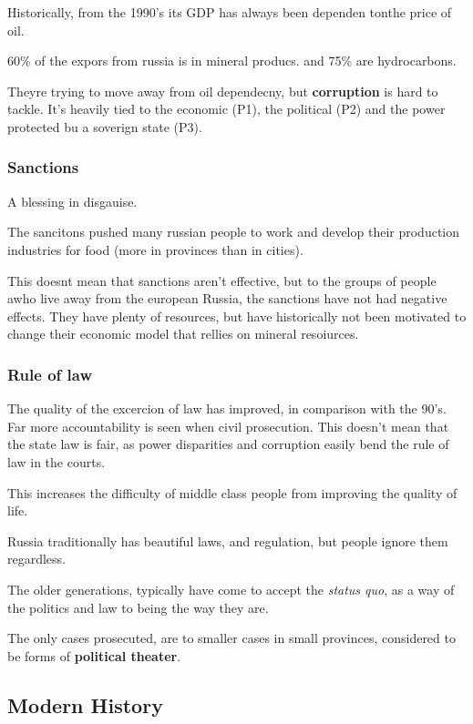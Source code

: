 Historically, from the 1990's its GDP has always been dependen tonthe price of oil.

60\% of the expors from russia is in mineral producs. and 75\% are hydrocarbons.

Theyre trying to move away from oil dependecny, but \textbf{corruption} is hard to tackle.
It's heavily tied to the economic (P1), the political (P2) and the power protected bu a soverign state (P3).

\subsubsection{Sanctions} 

A blessing in disgauise.

The sancitons pushed many russian people to work and develop their production industries for food (more in provinces than in cities).

This doesnt mean that sanctions aren't effective, but to the groups of people awho live away from the european Russia, the sanctions have not had negative effects. They have plenty of resources, but have historically not been motivated to change their economic model that rellies on mineral resoiurces.


\subsubsection{Rule of law}

The quality of the excercion of law has improved, in comparison with the 90's. Far more accountability is seen when civil prosecution. This doesn't mean that the state law is fair, as power disparities and corruption easily bend the rule of law in the courts.

This increases the difficulty of middle class people from improving the quality of life.

Russia traditionally has beautiful laws, and regulation, but people ignore them regardless.

The older generations, typically have come to accept the \textit{status quo}, as a way of the politics and law to being the way they are.

The only cases prosecuted, are to smaller cases in small provinces, considered to be forms of \textbf{political theater}.



\subsection{Modern History} 

